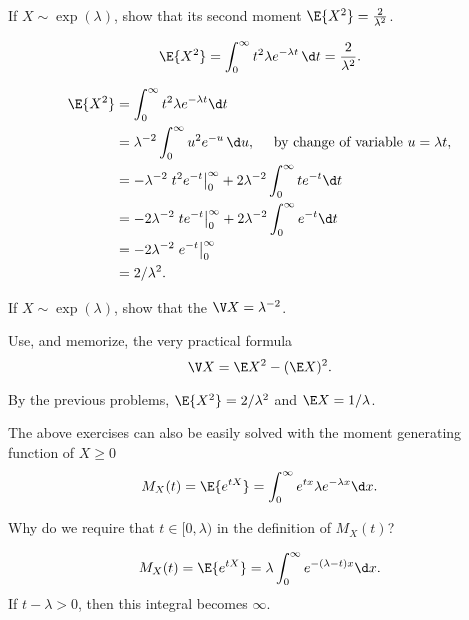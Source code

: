 \begin{exercise}\label{ex:15} 
  If $X\sim\exp(\lambda)$, show that its second moment $\E{X^2} =  \frac{2}{\lambda^2}$.
  \begin{hint}
  \begin{equation*}
  \E{X^2}= \int_0^\infty t^2 \lambda e^{-\lambda t}\, \d t =  \frac{2}{\lambda^2}.
  \end{equation*}
  \end{hint}
  \begin{solution}
    \begin{align*}
\E{X^2} 
&= \int_0^\infty t^2 \lambda e^{-\lambda t} \d t \\
&=   \lambda^{-2} \int_0^\infty u^2 e^{-u}\, \d u, \quad \text{ by  change of variable $u=\lambda t$},   \\
&= -\lambda^{-2}\left. t^2 e^{- t}\right|_0^\infty + 2\lambda^{-2}\int_0^\infty t e^{- t} \d t \\
&=  -2\lambda^{-2}\left. t e^{- t}\right|_0^\infty + 2\lambda^{-2} \int_0^\infty e^{- t} \d t\\
&=  - 2\lambda^{-2} \left. e^{- t} \right|_0^\infty \\
&=  2/\lambda^2.
    \end{align*}
  \end{solution}
\end{exercise}


\begin{exercise} 
  If $X\sim\exp(\lambda)$, show that the 
$\V X = \lambda^{-2}$.
  \begin{hint} Use, and memorize, the very practical formula
  \begin{equation*}
  \V X = \E X^2 - (\E X)^2.
  \end{equation*}
  \end{hint}
  \begin{solution}
    By the previous problems, $\E{X^2}=2/\lambda^2$ and $\E X = 1/\lambda$. 
  \end{solution}
\end{exercise}

The  above exercises can also be easily solved with the moment generating function of $X\geq 0$
\begin{equation*}
  M_X(t) = \E{e^{t X}} = \int_0^\infty e^{t x} \lambda e^{-\lambda x} \d x.
\end{equation*}

\begin{exercise}
Why do we require that $t \in [0, \lambda)$ in the definition of $M_X(t)$?
\begin{solution}
\begin{equation*}
  M_X(t) = \E{e^{t X}} = \lambda \int_0^\infty e^{-(\lambda-t) x}\d x.
\end{equation*}
  If $t - \lambda>0$, then this integral becomes $\infty$. 
\end{solution}
\end{exercise}

